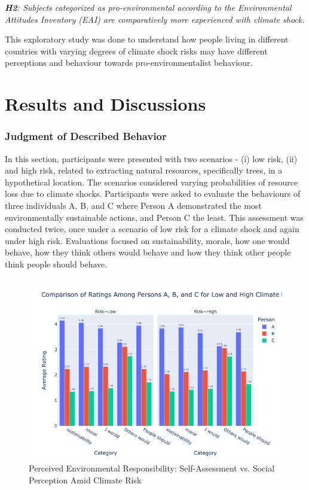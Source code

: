 \documentclass[11pt, a4paper, leqno]{article}
\begin{document}
\medskip
\begin{adjustbox}{minipage=.7\textwidth,margin=0pt \smallskipamount,center}
    \itshape \noindent \textbf{H2}: Subjects categorized as pro-environmental according to the Environmental Attitudes Inventory (EAI) are comparatively more experienced with climate shock.
\end{adjustbox}
\medskip

This exploratory study was done to understand how people living in different countries with varying degrees of climate shock risks may have different perceptions and behaviour
towards pro-environmentalist behaviour. 



 \section{Results and Discussions} %
\label{sec:Results & Discussions}

\subsubsection{Judgment of Described Behavior}


In this section, participants were presented with two scenarios - (i) low risk, (ii) and high risk, related to extracting natural resources, specifically trees, in a hypothetical location. The scenarios considered varying probabilities of resource loss due to climate shocks. 
Participants were asked to evaluate the behaviours of three individuals A, B, and C where Person A demonstrated the most environmentally sustainable actions, and Person C the least. This assessment was conducted twice, once under a scenario of low risk for a climate shock and again under high risk. Evaluations focused on sustainability, morals, how one would behave, how they think others would behave and how they think other people think people should behave.

\begin{figure}[H]
  \centering
  \includegraphics[width=1.0\textwidth]{../bld/Fig1.png} 
  \caption{Perceived Environmental Responsibility: Self-Assessment vs. Social Perception Amid Climate Risk}
\end{figure}
\end{document}
